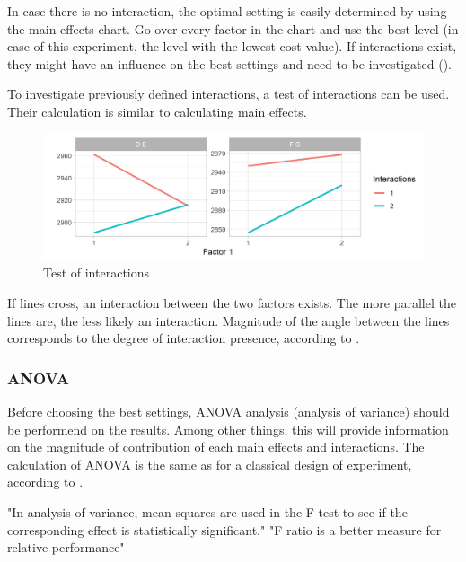 In case there is no interaction, the optimal setting is easily determined by using the main effects chart. Go over every factor in the chart and use the best level (in case of this experiment, the level with the lowest cost value). If interactions exist, they might have an influence on the best settings and need to be investigated (\cite{yang_design_2009}).

To investigate previously defined interactions, a test of interactions can be used. Their calculation is similar to calculating main effects.


\begin{figure}[ht] 
	\label{figure:taguchi:test_of_interaction}
	\includegraphics[width=1\linewidth]{simulations/taguchi/plots/test_of_interaction}
	\caption{Test of interactions}
\end{figure}

If lines cross, an interaction between the two factors exists. The more parallel the lines are, the less likely an interaction. Magnitude of the angle between the lines corresponds to the degree of interaction presence, according to \cite{roy_primer_1990}.

\subsubsection{ANOVA}
Before choosing the best settings, ANOVA analysis (analysis of variance) should be performend on the results. Among other things, this will provide information on the magnitude of contribution of each main effects and interactions. The calculation of ANOVA is the same as for a classical design of experiment, according to \cite{yang_design_2009}.


"In analysis of variance, mean squares are used in the F test to see if the corresponding effect is statistically significant."\cite{yang_design_2009}
"F ratio is a better measure for relative performance"\cite{yang_design_2009}


